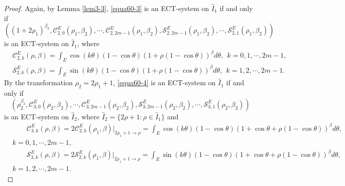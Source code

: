 \documentclass[11pt]{amsart}
\theoremstyle{remark}
\theoremstyle{definition}
\begin{document}
\begin{proof}
Again, by Lemma \ref{lem3-3},  \eqref{equa60-3} is  an ECT-system on   $\hat{I}_1$ if and only if
\begin{equation} \label{equa60-4}\left((1+2\rho_1)^{\beta_2}, \mathcal{C}_{2,0}^{E}(\rho_1,\beta_2), \cdots, \mathcal{C}_{2,2m-1}^{E}(\rho_1,\beta_2), \mathcal{S}_{2,2m-1}^{E}(\rho_1,\beta_2), \cdots, \mathcal{S}_{2,1}^{E}(\rho_1,\beta_2)\right) \end{equation}
is  an ECT-system on   $\hat{I}_1$, where
 \begin{equation*}
\begin{split}
&\mathcal{C}_{2,k}^{E}(\rho,\beta)=\int_{E}\cos (k\theta)(1-\cos \theta)\left(1+\rho(1-\cos\theta)\right)^{\beta}d\theta, \ \ k=0,1, \cdots, 2m-1, \\
&\mathcal{S}_{2,k}^{E}(\rho,\beta)=\int_{E}\sin (k\theta)(1-\cos \theta)\left(1+\rho(1-\cos\theta)\right)^{\beta}d\theta, \ \ k=1, 2,  \cdots, 2m-1.
\end{split}
\end{equation*}
By the transformation $\rho_2=2\rho_1+1$,  \eqref{equa60-4} is  an ECT-system on   $\hat{I}_1$ if and only if
\begin{equation} \label{equa60-5}\left(\rho_2^{\beta_2}, \mathcal{C}_{3,0}^{E}(\rho_2,\beta_2), \cdots, \mathcal{C}_{3,2m-1}^{E}(\rho_2,\beta_2), \mathcal{S}_{3,2m-1}^{E}(\rho_2,\beta_2), \cdots, \mathcal{S}_{3,1}^{E}(\rho_2,\beta_2)\right) \end{equation}
is  an ECT-system on   $\hat{I}_2$,  where $\hat{I}_2=\{ 2\rho+1:  \rho\in \hat{I}_1 \}$ and
 \begin{equation*}
\begin{split}
& \quad \quad \mathcal{C}_{3,k}^{E}(\rho,\beta)=2\mathcal{C}_{2,k}^{E}(\rho_1,\beta)\big|_{2\rho_1+1\to \rho}=\int_{E}\cos (k\theta)(1-\cos \theta)\left(1+\cos\theta+\rho(1-\cos\theta)\right)^{\beta}d\theta,\\
&  k=0,1, \cdots, 2m-1,\quad \quad\quad \quad\quad \quad\quad \quad\quad \quad\quad \quad\quad \quad\quad \quad\quad \quad\quad \quad\quad \quad\quad \quad\quad \quad\quad \quad\quad \quad\quad \quad\quad \quad \\
&\quad \quad \mathcal{S}_{3,k}^{E}(\rho,\beta)=2\mathcal{S}_{2,k}^{E}(\rho_1,\beta)\big|_{2\rho_1+1\to \rho}=\int_{E}\sin (k\theta)(1-\cos \theta)\left(1+\cos\theta+\rho(1-\cos\theta)\right)^{\beta}d\theta,\\
&   k=1, 2,  \cdots, 2m-1.
\end{split}
\end{equation*}


\end{proof}
\end{document}
